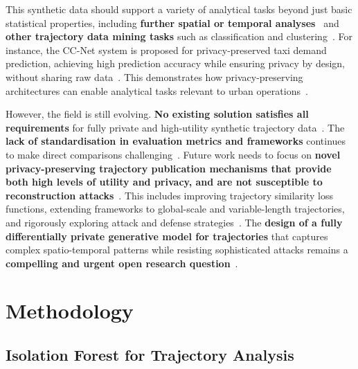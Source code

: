 \documentclass[runningheads]{llncs}
\begin{document}
This synthetic data should support a variety of analytical tasks beyond just basic statistical properties, including \textbf{further spatial or temporal analyses}~\cite{Rao2021LSTMTrajGAN,Chen2011DPTP} and \textbf{other trajectory data mining tasks} such as classification and clustering~\cite{Rao2021LSTMTrajGAN,Chen2011DPTP}. For instance, the CC-Net system is proposed for privacy-preserved taxi demand prediction, achieving high prediction accuracy while ensuring privacy by design, without sharing raw data~\cite{Ozeki2023PPTP}. This demonstrates how privacy-preserving architectures can enable analytical tasks relevant to urban operations~\cite{Ozeki2023PPTP,Jin2023SurveyExpStudy}.

However, the field is still evolving. \textbf{No existing solution satisfies all requirements} for fully private and high-utility synthetic trajectory data~\cite{Buchholz2024SoK}. The \textbf{lack of standardisation in evaluation metrics and frameworks} continues to make direct comparisons challenging~\cite{Primault2019LongRoad,Jin2023SurveyExpStudy}. Future work needs to focus on \textbf{novel privacy-preserving trajectory publication mechanisms that provide both high levels of utility and privacy, and are not susceptible to reconstruction attacks}~\cite{Buchholz2022RAoPT,Buchholz2024SoK,Primault2019LongRoad}. This includes improving trajectory similarity loss functions, extending frameworks to global-scale and variable-length trajectories, and rigorously exploring attack and defense strategies~\cite{Rao2021LSTMTrajGAN}. The \textbf{design of a fully differentially private generative model for trajectories} that captures complex spatio-temporal patterns while resisting sophisticated attacks remains a \textbf{compelling and urgent open research question}~\cite{Buchholz2024SoK,Buchholz2022RAoPT}.


\section{Methodology}
\label{sec:methodology}

\subsection{Isolation Forest for Trajectory Analysis}
\label{sec:iso}

\begin{compactoutline}
\end{compactoutline}
\end{document}
